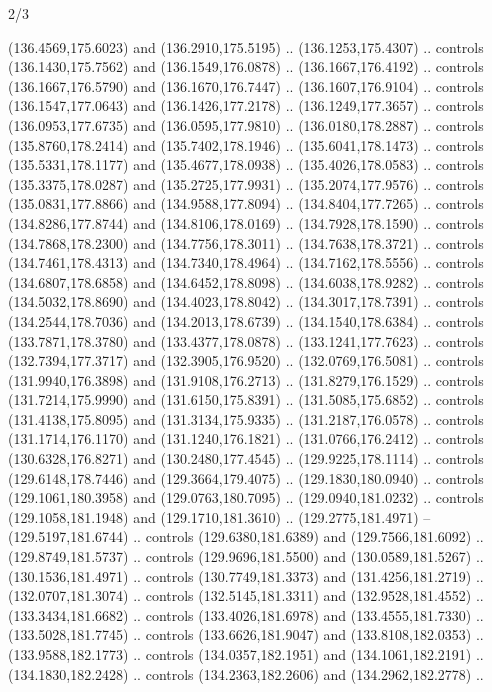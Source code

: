 \begin{flagdescription}{2/3}
\begin{scope}[shift={(0.5\flaglength,0.5)},scale=\flagwidth/320]
\begin{scope}[y=0.8pt, x=0.8pt, yscale=-1,shift={(-118.3,-146)}]
  (136.4569,175.6023) and (136.2910,175.5195) .. (136.1253,175.4307) .. controls
  (136.1430,175.7562) and (136.1549,176.0878) .. (136.1667,176.4192) .. controls
  (136.1667,176.5790) and (136.1670,176.7447) .. (136.1607,176.9104) .. controls
  (136.1547,177.0643) and (136.1426,177.2178) .. (136.1249,177.3657) .. controls
  (136.0953,177.6735) and (136.0595,177.9810) .. (136.0180,178.2887) .. controls
  (135.8760,178.2414) and (135.7402,178.1946) .. (135.6041,178.1473) .. controls
  (135.5331,178.1177) and (135.4677,178.0938) .. (135.4026,178.0583) .. controls
  (135.3375,178.0287) and (135.2725,177.9931) .. (135.2074,177.9576) .. controls
  (135.0831,177.8866) and (134.9588,177.8094) .. (134.8404,177.7265) .. controls
  (134.8286,177.8744) and (134.8106,178.0169) .. (134.7928,178.1590) .. controls
  (134.7868,178.2300) and (134.7756,178.3011) .. (134.7638,178.3721) .. controls
  (134.7461,178.4313) and (134.7340,178.4964) .. (134.7162,178.5556) .. controls
  (134.6807,178.6858) and (134.6452,178.8098) .. (134.6038,178.9282) .. controls
  (134.5032,178.8690) and (134.4023,178.8042) .. (134.3017,178.7391) .. controls
  (134.2544,178.7036) and (134.2013,178.6739) .. (134.1540,178.6384) .. controls
  (133.7871,178.3780) and (133.4377,178.0878) .. (133.1241,177.7623) .. controls
  (132.7394,177.3717) and (132.3905,176.9520) .. (132.0769,176.5081) .. controls
  (131.9940,176.3898) and (131.9108,176.2713) .. (131.8279,176.1529) .. controls
  (131.7214,175.9990) and (131.6150,175.8391) .. (131.5085,175.6852) .. controls
  (131.4138,175.8095) and (131.3134,175.9335) .. (131.2187,176.0578) .. controls
  (131.1714,176.1170) and (131.1240,176.1821) .. (131.0766,176.2412) .. controls
  (130.6328,176.8271) and (130.2480,177.4545) .. (129.9225,178.1114) .. controls
  (129.6148,178.7446) and (129.3664,179.4075) .. (129.1830,180.0940) .. controls
  (129.1061,180.3958) and (129.0763,180.7095) .. (129.0940,181.0232) .. controls
  (129.1058,181.1948) and (129.1710,181.3610) .. (129.2775,181.4971) --
  (129.5197,181.6744) .. controls (129.6380,181.6389) and (129.7566,181.6092) ..
  (129.8749,181.5737) .. controls (129.9696,181.5500) and (130.0589,181.5267) ..
  (130.1536,181.4971) .. controls (130.7749,181.3373) and (131.4256,181.2719) ..
  (132.0707,181.3074) .. controls (132.5145,181.3311) and (132.9528,181.4552) ..
  (133.3434,181.6682) .. controls (133.4026,181.6978) and (133.4555,181.7330) ..
  (133.5028,181.7745) .. controls (133.6626,181.9047) and (133.8108,182.0353) ..
  (133.9588,182.1773) .. controls (134.0357,182.1951) and (134.1061,182.2191) ..
  (134.1830,182.2428) .. controls (134.2363,182.2606) and (134.2962,182.2778) ..

\end{scope}
\end{scope}
\end{flagdescription}
